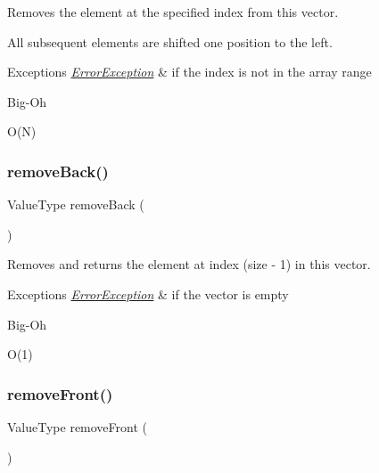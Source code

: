 Removes the element at the specified index from this vector. 

All subsequent elements are shifted one position to the left. 
\begin{DoxyExceptions}{Exceptions}
{\em \mbox{\hyperlink{classErrorException}{Error\+Exception}}} & if the index is not in the array range \\
\hline
\end{DoxyExceptions}
\begin{DoxyRefDesc}{Big-\/\+Oh}
\item[\mbox{\hyperlink{BigOh__BigOh000123}{Big-\/\+Oh}}]O(\+N) \end{DoxyRefDesc}
\mbox{\label{classVector_af7878e9c2f67e06cbae525e9fa77e38e}} 
\subsubsection{\texorpdfstring{remove\+Back()}{removeBack()}}
{\footnotesize\ttfamily Value\+Type remove\+Back (\begin{DoxyParamCaption}{ }\end{DoxyParamCaption})}



Removes and returns the element at index (size -\/ 1) in this vector. 


\begin{DoxyExceptions}{Exceptions}
{\em \mbox{\hyperlink{classErrorException}{Error\+Exception}}} & if the vector is empty \\
\hline
\end{DoxyExceptions}
\begin{DoxyRefDesc}{Big-\/\+Oh}
\item[\mbox{\hyperlink{BigOh__BigOh000125}{Big-\/\+Oh}}]O(1) \end{DoxyRefDesc}
\mbox{\label{classVector_a02453aa96e93c38ca4c1d176307c8a63}} 
\subsubsection{\texorpdfstring{remove\+Front()}{removeFront()}}
{\footnotesize\ttfamily Value\+Type remove\+Front (\begin{DoxyParamCaption}{ }\end{DoxyParamCaption})}



